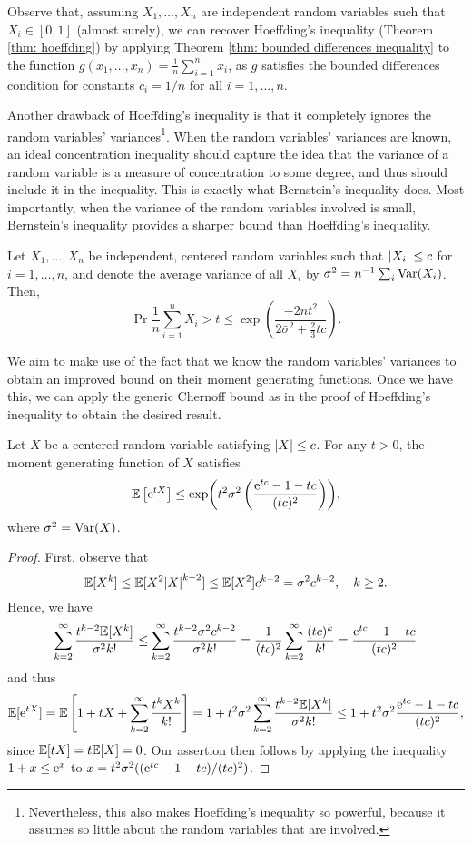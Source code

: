 Observe that, assuming $X_1, \dots, X_n$ are independent random variables such that $X_i \in [0, 1]$ (almost surely), we can recover Hoeffding's inequality (Theorem \ref{thm: hoeffding}) by applying Theorem \ref{thm: bounded differences inequality} to the function $g(x_1, \dots, x_n) = \frac{1}{n} \sum_{i=1}^n x_i$, as $g$ satisfies the bounded differences condition for constants $c_i = 1/n$ for all $i = 1, \dots, n$.

Another drawback of Hoeffding's inequality is that it completely ignores the random variables' variances\footnote{Nevertheless, this also makes Hoeffding's inequality so powerful, because it assumes so little about the random variables that are involved.}. When the random variables' variances are known, an ideal concentration inequality should capture the idea that the variance of a random variable is a measure of concentration to some degree, and thus should include it in the inequality. This is exactly what Bernstein's inequality does. Most importantly, when the variance of the random variables involved is small, Bernstein's inequality provides a sharper bound than Hoeffding's inequality.

\begin{theorem}
\label{thm: bernstein}
Let $X_1, \dots, X_n$ be independent, centered random variables such that $\abs{X_i} \leq c$ for $i = 1, \dots, n$, and denote the average variance of all $X_i$ by $\bar\sigma^2 = n^{-1} \sum_i \mathrm{Var}(X_i)$. Then,
\[
    \Pr{\frac{1}{n} \sum_{i=1}^n X_i > t} \leq \exp(\frac{-2nt^2}{2\bar\sigma^2 + \frac{2}{3}tc}).
\]
\end{theorem}

We aim to make use of the fact that we know the random variables' variances to obtain an improved bound on their moment generating functions. Once we have this, we can apply the generic Chernoff bound as in the proof of Hoeffding's inequality to obtain the desired result.

\begin{lemma}
\label{lem: bernstein}
Let $X$ be a centered random variable satisfying $\abs{X} \leq c$. For any $t > 0$, the moment generating function of $X$ satisfies
\[
    \mathbb{E}\left[\mathrm{e}^{tX}\right] \leq \exp( t^2 \sigma^2 \left( \frac{\mathrm{e}^{tc} - 1 - tc}{(tc)^2} \right) ),
\]
where $\sigma^2 = \mathrm{Var}(X)$.
\end{lemma}

\begin{proof}
First, observe that
\[
    \mathbb{E}[X^k] \leq \mathbb{E}[X^2 \abs{X}^{k-2}] \leq \mathbb{E}[X^2] c^{k-2} = \sigma^2 c^{k-2}, \quad k \geq 2.
\]
Hence, we have
\[
    \sum_{k=2}^\infty \frac{t^{k-2} \mathbb{E}[X^k]}{\sigma^2 k!} \leq \sum_{k=2}^\infty \frac{t^{k-2} \sigma^2 c^{k-2}}{\sigma^2 k!} = \frac{1}{(tc)^2} \sum_{k=2}^\infty \frac{(tc)^k}{k!} = \frac{\mathrm{e}^{tc} - 1 - tc}{(tc)^2}
\]
and thus
\[
    \mathbb{E}[\mathrm{e}^{tX}] = \mathbb{E}\left[1 + tX + \sum_{k=2}^\infty \frac{t^k X^k}{k!}\right] = 1 + t^2 \sigma^2 \sum_{k=2}^\infty \frac{t^{k-2} \mathbb{E}[X^k]}{\sigma^2 k!} \leq 1 + t^2 \sigma^2 \frac{\mathrm{e}^{tc} - 1 - tc}{(tc)^2},
\]
since $\mathbb{E}[tX] = t \mathbb{E}[X] = 0$. Our assertion then follows by applying the inequality $1 + x \leq \mathrm{e}^x$ to $x = t^2 \sigma^2 ((\mathrm{e}^{tc} - 1 - tc)/(tc)^2)$.
\end{proof}

